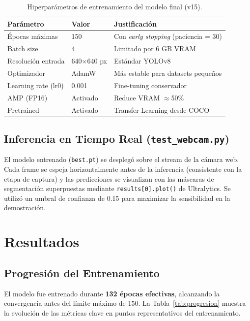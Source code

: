\documentclass[12pt,letterpaper]{article}
\begin{document}
\begin{table}[h!]
\centering
\caption{Hiperparámetros de entrenamiento del modelo final (v15).}
\label{tab:hiper}
\begin{tabular}{@{}lll@{}}
\toprule
\textbf{Parámetro} & \textbf{Valor} & \textbf{Justificación} \\ \midrule
Épocas máximas     & 150            & Con \textit{early stopping} (paciencia = 30) \\
Batch size         & 4              & Limitado por 6 GB VRAM \\
Resolución entrada & 640$\times$640 px & Estándar YOLOv8 \\
Optimizador        & AdamW          & Más estable para datasets pequeños \\
Learning rate (lr0)& 0.001          & Fine-tuning conservador \\
AMP (FP16)         & Activado       & Reduce VRAM $\approx$50\% \\
Pretrained         & Activado       & Transfer Learning desde COCO \\ \bottomrule
\end{tabular}
\end{table}

\subsection{Inferencia en Tiempo Real (\texttt{test\_webcam.py})}
El modelo entrenado (\texttt{best.pt}) se desplegó sobre el stream de la cámara web. Cada frame se espeja horizontalmente antes de la inferencia (consistente con la etapa de captura) y las predicciones se visualizan con las máscaras de segmentación superpuestas mediante \texttt{results[0].plot()} de Ultralytics. Se utilizó un umbral de confianza de 0.15 para maximizar la sensibilidad en la demostración.

\section{Resultados}

\subsection{Progresión del Entrenamiento}
El modelo fue entrenado durante \textbf{132 épocas efectivas}, alcanzando la convergencia antes del límite máximo de 150. La Tabla~\ref{tab:progresion} muestra la evolución de las métricas clave en puntos representativos del entrenamiento.
\end{document}

